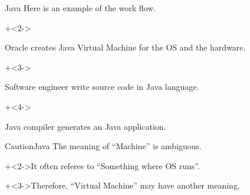 \begin{frame}{Java}{}
    Here is an example of the work flow.
    \vspace{4ex}

    \begin{enumerate}
        \onslide+<2->{\item Oracle creates Java Virtual Machine for the OS and the hardware.}
        \onslide+<3->{\item Software engineer write source code in Java language.}
        \onslide+<4->{\item Java compiler generates an Java application.}
    \end{enumerate}
\end{frame}


\begin{frame}{Caution}{Java}
    The meaning of ``Machine'' is ambiguous.
    \vspace{2ex}

    \onslide+<2->{It often referes to ``Something where OS runs''.}
    \vspace{4ex}

    \onslide+<3->{Therefore, ``Virtual Machine'' may have another meaning.}
\end{frame}
